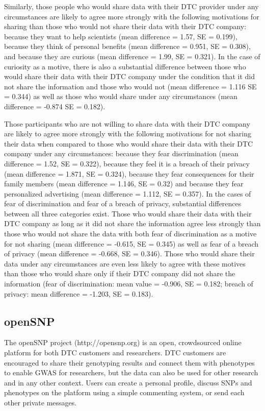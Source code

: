 \documentclass[10pt]{article}
\begin{document}
Similarly, those people who would share data with their DTC provider under any circumstances are likely to agree more strongly with 
the following motivations for sharing than those who would not share their data with their DTC company: because they want to help 
scientists (mean difference = 1.57, SE = 0.199), because they think of personal benefits (mean difference = 0.951, SE = 0.308), 
and because they are curious (mean difference = 1.99, SE = 0.321). In the case of curiosity as a motive, there is also a substantial difference between those who would share their data with their DTC company under the condition that it did not share the information and those who would not (mean difference = 1.116 SE = 0.344) as well as those who would share under any circumstances (mean difference = -0.874 SE = 0.182).

Those participants who are not willing to share data with their DTC company are likely to agree more strongly with the following motivations 
for not sharing their data when compared to those who would share their data with their DTC company under any circumstances: because they 
fear discrimination (mean difference = 1.52, SE = 0.322), because they feel it is a breach of their privacy (mean difference = 1.871, SE = 0.324), 
because they fear consequences for their family members (mean difference = 1.146, SE = 0.32) and because they fear personalized advertising (mean difference =  1.112, SE = 0.357). In the cases of fear of discrimination and fear of a breach of privacy, substantial differences between all three categories exist. Those who would share their data with their DTC company as long as it did not share the information agree less strongly than those who would not share the data with both fear of discrimination as a motive for not sharing (mean difference = -0.615, SE = 0.345) as well as fear of a breach of privacy (mean difference = -0.668, SE = 0.346). Those who would share their data under any circumstances are even less likely to agree with these motives than those who would share only if their DTC company did not share the information (fear of discrimination: mean value = -0.906, SE = 0.182; breach of privacy: mean difference = -1.203, SE = 0.183).

\subsection*{openSNP}

The openSNP project (http://opensnp.org) is an open, crowdsourced online platform for both DTC customers and researchers. 
DTC customers are encouraged to share their genotyping results and connect them with phenotypes to enable GWAS for researchers,
but the data can also be used for other research and in any other context.  
Users can create a personal profile, discuss SNPs and phenotypes on the 
platform using a simple commenting system, or send each other private messages. 
\end{document}
